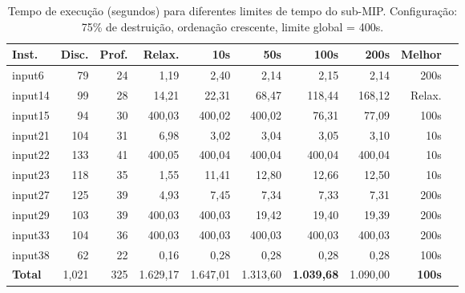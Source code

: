 \begin{table}[htbp]
\centering
\caption{Tempo de execução (segundos) para diferentes limites de tempo do sub-MIP. Configuração: 75\% de destruição, ordenação crescente, limite global = 400s.}
\label{tab:lns_time_tempo}
\small
\begin{tabular}{@{}lrrrrrrrrr@{}}
\toprule
\textbf{Inst.} & \textbf{Disc.} & \textbf{Prof.} & \textbf{Relax.} & \textbf{10s} & \textbf{50s} & \textbf{100s} & \textbf{200s} & \textbf{Melhor} \\
\midrule
input6  & 79  & 24 & 1,19   & 2,40   & 2,14   & 2,15   & 2,14   & 200s \\
input14 & 99  & 28 & 14,21  & 22,31  & 68,47  & 118,44 & 168,12 & Relax. \\
input15 & 94  & 30 & 400,03 & 400,02 & 400,02 & 76,31 & 77,09 & 100s \\
input21 & 104 & 31 & 6,98   & 3,02   & 3,04   & 3,05   & 3,10   & 10s \\
input22 & 133 & 41 & 400,05 & 400,04 & 400,04 & 400,04 & 400,04 & 10s \\
input23 & 118 & 35 & 1,55   & 11,41  & 12,80  & 12,66  & 12,50  & 10s \\
input27 & 125 & 39 & 4,93   & 7,45   & 7,34   & 7,33   & 7,31   & 200s \\
input29 & 103 & 39 & 400,03 & 400,03 & 19,42  & 19,40  & 19,39  & 200s \\
input33 & 104 & 36 & 400,03 & 400,03 & 400,03 & 400,03 & 400,03 & 200s \\
input38 & 62  & 22 & 0,16   & 0,28   & 0,28   & 0,28   & 0,28   & 100s \\
\midrule
\textbf{Total} & 1,021 & 325 & 1.629,17 & 1.647,01 & 1.313,60 & \textbf{1.039,68} & 1.090,00 & \textbf{100s} \\
\bottomrule
\end{tabular}
\end{table}

